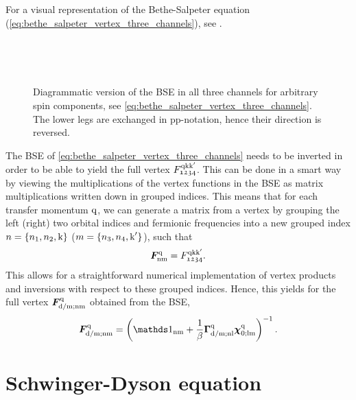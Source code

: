\documentclass[../../main.tex]{subfiles}
\begin{document}
For a visual representation of the Bethe-Salpeter equation (\ref{eq:bethe_salpeter_vertex_three_channels}), see .
\begin{figure}[ht!]
  \centering
  \parbox{\textwidth}{
    \subfloat{}
  }\\[1cm]
  \parbox{\textwidth}{
    \subfloat{}
  }\\[1cm]
  \parbox{\textwidth}{
    \subfloat{}
  }
  \caption{Diagrammatic version of the BSE in all three channels for arbitrary spin components, see \eqref{eq:bethe_salpeter_vertex_three_channels}. The lower legs are exchanged in pp-notation, hence their direction is reversed.}
  \label{fig:bethe_salpeter_diagrammatic}
\end{figure}
The BSE of \eqref{eq:bethe_salpeter_vertex_three_channels} needs to be inverted in order to be able to yield the full vertex $F_{\mathfrak{1234}}^{\text{q}\text{k}\text{k}'}$. This can be done in a smart way by viewing the multiplications of the vertex functions in the BSE as matrix multiplications written down in grouped indices. This means that for each transfer momentum $\text{q}$, we can generate a matrix from a vertex by grouping the left (right) two orbital indices and fermionic frequencies into a new grouped index $n=\{n_1, n_2, \text{k}\}$ ($m=\{n_3, n_4, \text{k}'\}$), such that \cite{ab initio dyn} 
\begin{align}
	\bm{F}^{\text{q}}_{\text{nm}}=F^{\text{q}\text{k}\text{k}'}_{\mathfrak{1234}}.
\end{align}
This allows for a straightforward numerical implementation of vertex products and inversions with respect to these grouped indices. Hence, this yields for the full vertex $\bm{F}^{\text{q}}_{\text{d}/\text{m};\text{nm}}$ obtained from the BSE,
\begin{align}
	\bm{F}^{\q}_{\dens/\magn;\text{nm}}=\left (\unity_{\text{nm}} +\frac1\beta \bm{\Gamma}^{\q}_{\dens/\magn;\text{nl}}\bm{\chi}^{\q}_{0;\text{lm}}\right )^{-1}.
\end{align}

\section{Schwinger-Dyson equation}\label{sec:schwinger_dyson}
\end{document}
